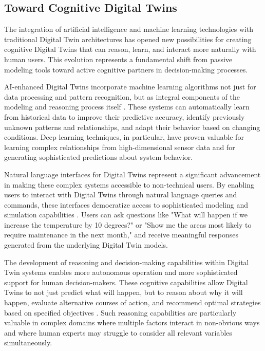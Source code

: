 \subsection{Toward Cognitive Digital Twins}

The integration of artificial intelligence and machine learning technologies with traditional Digital Twin architectures has opened new possibilities for creating cognitive Digital Twins that can reason, learn, and interact more naturally with human users. This evolution represents a fundamental shift from passive modeling tools toward active cognitive partners in decision-making processes.

AI-enhanced Digital Twins incorporate machine learning algorithms not just for data processing and pattern recognition, but as integral components of the modeling and reasoning process itself \cite{werner2021digital}. These systems can automatically learn from historical data to improve their predictive accuracy, identify previously unknown patterns and relationships, and adapt their behavior based on changing conditions. Deep learning techniques, in particular, have proven valuable for learning complex relationships from high-dimensional sensor data and for generating sophisticated predictions about system behavior.

Natural language interfaces for Digital Twins represent a significant advancement in making these complex systems accessible to non-technical users. By enabling users to interact with Digital Twins through natural language queries and commands, these interfaces democratize access to sophisticated modeling and simulation capabilities \cite{lu2020digital}. Users can ask questions like "What will happen if we increase the temperature by 10 degrees?" or "Show me the areas most likely to require maintenance in the next month," and receive meaningful responses generated from the underlying Digital Twin models.

The development of reasoning and decision-making capabilities within Digital Twin systems enables more autonomous operation and more sophisticated support for human decision-makers. These cognitive capabilities allow Digital Twins to not just predict what will happen, but to reason about why it will happen, evaluate alternative courses of action, and recommend optimal strategies based on specified objectives \cite{hartmann2018digital}. Such reasoning capabilities are particularly valuable in complex domains where multiple factors interact in non-obvious ways and where human experts may struggle to consider all relevant variables simultaneously.

